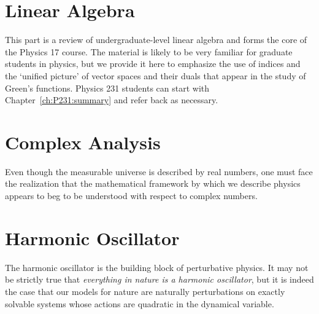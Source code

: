 \documentclass[12pt, oneside]{report}
\begin{document}






\part{Linear Algebra}

This part is a review of undergraduate-level linear algebra and forms the core of the Physics 17 course. The material is likely to be very familiar for graduate students in physics, but we provide it here to emphasize the use of indices and the `unified picture' of vector spaces and their duals that appear in the study of Green's functions. Physics 231 students can start with Chapter~\eqref{ch:P231:summary} and refer back as necessary.




















\part{Complex Analysis}

Even though the measurable universe is described by real numbers, one must face the realization that the mathematical framework by which we describe physics appears to beg to be understood with respect to complex numbers. 






\part{Harmonic Oscillator}

The harmonic oscillator is the building block of perturbative physics. It may not be strictly true that \emph{everything in nature is a harmonic oscillator}, but it is indeed the case that our models for nature are naturally perturbations on exactly solvable systems whose actions are quadratic in the dynamical variable.
\end{document}
